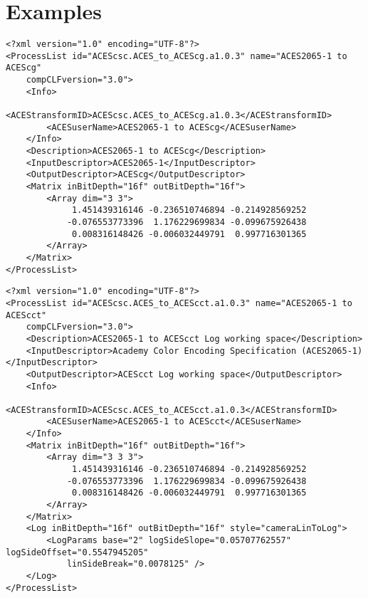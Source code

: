\regularsectionformat
\chapter{Examples}
\label{sec:examples}

\begin{lstlisting}[caption=ACES2065-1 to ACEScg]
<?xml version="1.0" encoding="UTF-8"?>
<ProcessList id="ACEScsc.ACES_to_ACEScg.a1.0.3" name="ACES2065-1 to ACEScg" 
    compCLFversion="3.0">
    <Info>
        <ACEStransformID>ACEScsc.ACES_to_ACEScg.a1.0.3</ACEStransformID>
        <ACESuserName>ACES2065-1 to ACEScg</ACESuserName>
    </Info>
    <Description>ACES2065-1 to ACEScg</Description>
    <InputDescriptor>ACES2065-1</InputDescriptor>
    <OutputDescriptor>ACEScg</OutputDescriptor>
    <Matrix inBitDepth="16f" outBitDepth="16f">
        <Array dim="3 3">
             1.451439316146 -0.236510746894 -0.214928569252
            -0.076553773396  1.176229699834 -0.099675926438
             0.008316148426 -0.006032449791  0.997716301365
        </Array>
    </Matrix>
</ProcessList>
\end{lstlisting}

\begin{lstlisting}[caption=ACES2065-1 to ACEScct]
<?xml version="1.0" encoding="UTF-8"?>
<ProcessList id="ACEScsc.ACES_to_ACEScct.a1.0.3" name="ACES2065-1 to ACEScct" 
    compCLFversion="3.0">
    <Description>ACES2065-1 to ACEScct Log working space</Description>
    <InputDescriptor>Academy Color Encoding Specification (ACES2065-1)</InputDescriptor>
    <OutputDescriptor>ACEScct Log working space</OutputDescriptor>
    <Info>
        <ACEStransformID>ACEScsc.ACES_to_ACEScct.a1.0.3</ACEStransformID>
        <ACESuserName>ACES2065-1 to ACEScct</ACESuserName>
    </Info>
    <Matrix inBitDepth="16f" outBitDepth="16f">
        <Array dim="3 3 3">
             1.451439316146 -0.236510746894 -0.214928569252
            -0.076553773396  1.176229699834 -0.099675926438
             0.008316148426 -0.006032449791  0.997716301365
        </Array>
    </Matrix>
    <Log inBitDepth="16f" outBitDepth="16f" style="cameraLinToLog">
        <LogParams base="2" logSideSlope="0.05707762557" logSideOffset="0.5547945205" 
            linSideBreak="0.0078125" />
    </Log>
</ProcessList>
\end{lstlisting}

